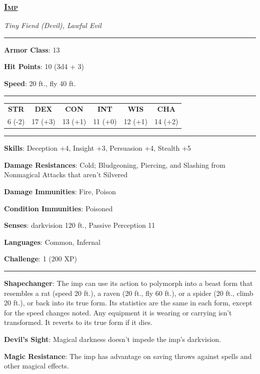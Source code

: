 \subsubsection*{\underline{\textsc{\Large Imp}}}
\noindent\emph{Tiny Fiend (Devil), Lawful Evil}

\noindent\rule{0.5\textwidth}{0.5pt}

\noindent\textbf{Armor Class}: 13

\noindent\textbf{Hit Points}: 10 (3d4 + 3)

\noindent\textbf{Speed}: 20 ft., fly 40 ft.

\noindent\rule{0.5\textwidth}{0.5pt}
\begin{table}[H]
	\begin{tabular}{cccccc}
		\textbf{STR} & \textbf{DEX} & \textbf{CON} & \textbf{INT} & \textbf{WIS} & \textbf{CHA} \\
		6 (-2) & 17 (+3) & 13 (+1) & 11 (+0) & 12 (+1) & 14 (+2) \\
	\end{tabular}
\end{table}
\noindent\rule{0.5\textwidth}{0.5pt}

\noindent\textbf{Skills}: Deception +4, Insight +3, Persuasion +4, Stealth +5

\noindent\textbf{Damage Resistances}:  Cold; Bludgeoning, Piercing, and Slashing from Nonmagical Attacks that aren't Silvered

\noindent\textbf{Damage Immunities}: Fire, Poison

\noindent\textbf{Condition Immunities}: Poisoned

\noindent\textbf{Senses}: darkvision 120 ft., Passive Perception 11

\noindent\textbf{Languages}: Common, Infernal

\noindent\textbf{Challenge}: 1 (200 XP)

\noindent\rule{0.5\textwidth}{0.5pt}

\noindent\textbf{Shapechanger}: The imp can use its action to polymorph into a beast form that resembles a rat (speed 20 ft.), a raven (20 ft., fly 60 ft.), or a spider (20 ft., climb 20 ft.), or back into its true form. Its statistics are the same in each form, except for the speed changes noted. Any equipment it is wearing or carrying isn't transformed. It reverts to its true form if it dies.

\noindent\textbf{Devil's Sight}: Magical darkness doesn't impede the imp's darkvision.

\noindent\textbf{Magic Resistance}: The imp has advantage on saving throws against spells and other magical effects.


